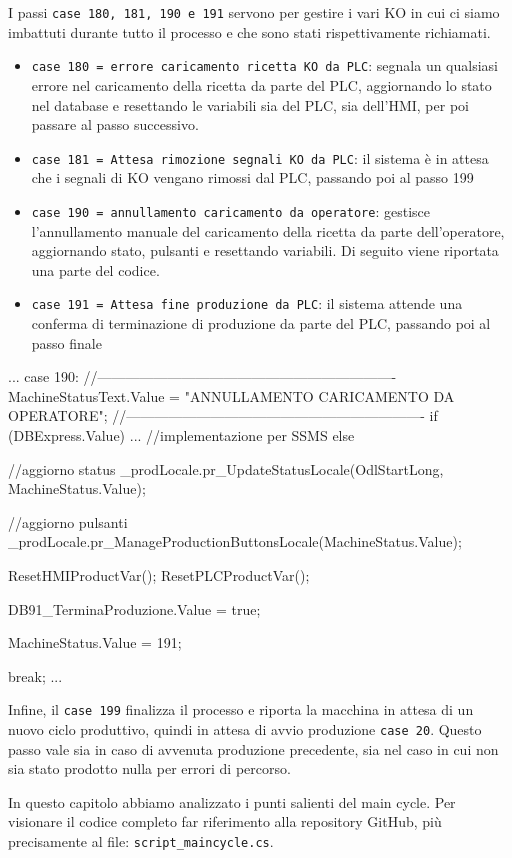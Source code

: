 I passi \verb|case 180, 181, 190 e 191| servono per gestire i vari KO in cui ci siamo imbattuti durante tutto il processo e che sono stati rispettivamente richiamati.
\begin{itemize}
    \item \verb|case 180 = errore caricamento ricetta KO da PLC|: segnala un qualsiasi errore nel caricamento della ricetta da parte del PLC, aggiornando lo stato nel database e resettando le variabili sia del PLC, sia dell'HMI, per poi passare al passo successivo.
    \item \verb|case 181 = Attesa rimozione segnali KO da PLC|: il sistema è in attesa che i segnali di KO vengano rimossi dal PLC, passando poi al passo 199
    \item \verb|case 190 = annullamento caricamento da operatore|: gestisce l'annullamento manuale del caricamento della ricetta da parte dell'operatore, aggiornando stato, pulsanti e resettando variabili. Di seguito viene riportata una parte del codice.
    \item \verb|case 191 = Attesa fine produzione da PLC|: il sistema attende una conferma di terminazione di produzione da parte del PLC, passando poi al passo finale
\end{itemize}
\begin{csharp}
...
    case 190:
    //----------------------------------------------------------------
    MachineStatusText.Value = "ANNULLAMENTO CARICAMENTO DA OPERATORE";
    //----------------------------------------------------------------
    if (DBExpress.Value)
    {
        ... //implementazione per SSMS
    }
    else
    {
        //aggiorno status
        _prodLocale.pr_UpdateStatusLocale(OdlStartLong, MachineStatus.Value);

        //aggiorno pulsanti
        _prodLocale.pr_ManageProductionButtonsLocale(MachineStatus.Value);

        ResetHMIProductVar();
        ResetPLCProductVar();

        DB91_TerminaProduzione.Value = true;

        MachineStatus.Value = 191;
    }

    break;
...
\end{csharp}
Infine, il \verb|case 199| finalizza il processo e riporta la macchina in attesa di un nuovo ciclo produttivo, quindi in attesa di avvio produzione \verb|case 20|. Questo passo vale sia in caso di avvenuta produzione precedente, sia nel caso in cui non sia stato prodotto nulla per errori di percorso.
\begin{csharp}
...
        case 199:
        //----------------------------------------------------------------------
        MachineStatusText.Value = "Termina produzione completata correttamente";
        //----------------------------------------------------------------------

        if (!DB92_AckTerminaProduzione.Value)
        {
            MachineStatus.Value = 20;
        }

        break;

    default:
        break;
}
...
\end{csharp}
In questo capitolo abbiamo analizzato i punti salienti del main cycle. Per visionare il codice completo far riferimento alla repository GitHub, più precisamente al file: \verb|script_maincycle.cs|.

